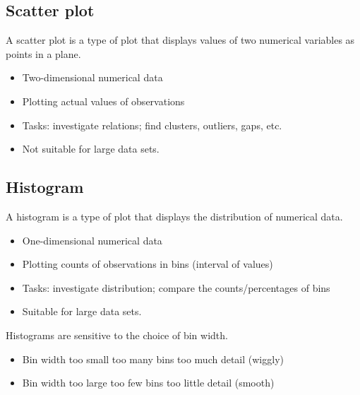 \subsection{Scatter plot}
\begin{definition}
    A scatter plot is a type of plot that displays values of two numerical variables as points in a plane.

    \begin{itemize}
        \item Two-dimensional numerical data
        \item Plotting actual values of observations
        \item Tasks: investigate relations; find clusters, outliers, gaps, etc.
        \item Not suitable for large data sets.
    \end{itemize}

\end{definition}

\subsection{Histogram}
\begin{definition}[Histogram]
    A histogram is a type of plot that displays the distribution of numerical data.

    \begin{itemize}
        \item One-dimensional numerical data
        \item Plotting counts of observations in bins (interval of values)
        \item Tasks: investigate distribution; compare the counts/percentages of bins
        \item Suitable for large data sets.
    \end{itemize}
\end{definition}

\begin{remark}
    Histograms are sensitive to the choice of bin width.
    \begin{itemize}
        \item Bin width too small \textrightarrow too many bins \textrightarrow too much detail (wiggly)
        \item Bin width too large \textrightarrow too few bins \textrightarrow too little detail (smooth)
    \end{itemize}
\end{remark}

